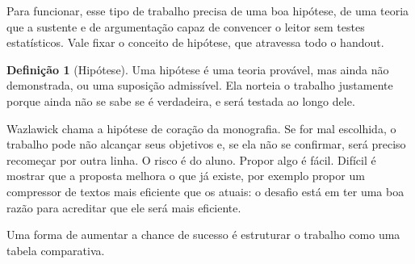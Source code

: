 \documentclass[10pt,a4paper]{extarticle}
\theoremstyle{definition}
\newtheorem{definition}{Definição}[section]
\begin{document}
Para funcionar, esse tipo de trabalho precisa de uma boa hipótese, de uma teoria que a sustente e de argumentação capaz de convencer o leitor sem testes estatísticos. Vale fixar o conceito de hipótese, que atravessa todo o handout.

\begin{definition}[Hipótese]
Uma hipótese é uma teoria provável, mas ainda não demonstrada, ou uma suposição admissível. Ela norteia o trabalho justamente porque ainda não se sabe se é verdadeira, e será testada ao longo dele.
\end{definition}

Wazlawick chama a hipótese de coração da monografia. Se for mal escolhida, o trabalho pode não alcançar seus objetivos e, se ela não se confirmar, será preciso recomeçar por outra linha. O risco é do aluno. Propor algo é fácil. Difícil é mostrar que a proposta melhora o que já existe, por exemplo propor um compressor de textos mais eficiente que os atuais: o desafio está em ter uma boa razão para acreditar que ele será mais eficiente.

Uma forma de aumentar a chance de sucesso é estruturar o trabalho como uma tabela comparativa.
\end{document}
